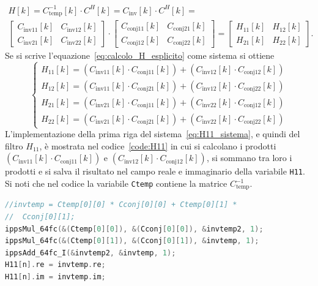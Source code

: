 \documentclass[12pt,a4paper,titlepage]{article}
\begin{document}
\begin{equation}\label{eq:calcolo_H_esplicito}
\begin{split}
H[k] = C_{\text{temp}}^{-1}[k] \cdot C^H[k] = C_{\text{inv}}[k] \cdot C^H[k] =\\
\begin{bmatrix}
C_{\text{inv}11}[k]	&	C_{\text{inv}12}[k]\\
C_{\text{inv}21}[k]	&	C_{\text{inv}22}[k]
\end{bmatrix}
\cdot
\begin{bmatrix}
C_{\text{conj}11}[k]	&	C_{\text{conj}21}[k]\\
C_{\text{conj}12}[k]	&	C_{\text{conj}22}[k]
\end{bmatrix}
=
\begin{bmatrix}
H_{11}[k]	&	H_{12}[k]\\
H_{21}[k]	&	H_{22}[k]
\end{bmatrix}.
\end{split}
\end{equation}
Se si scrive l'equazione~\eqref{eq:calcolo_H_esplicito} come sistema si ottiene
\begin{equation}\label{eq:H11_sistema}
\begin{cases}
H_{11}[k] = \left(C_{\text{inv}11}[k] \cdot C_{\text{conj}11}[k]\right) + \left(C_{\text{inv}12}[k] \cdot C_{\text{conj}12}[k]\right)\\
H_{12}[k] = \left(C_{\text{inv}11}[k] \cdot C_{\text{conj}21}[k]\right) + \left(C_{\text{inv}12}[k] \cdot C_{\text{conj}22}[k]\right)\\
H_{21}[k] = \left(C_{\text{inv}21}[k] \cdot C_{\text{conj}11}[k]\right) + \left(C_{\text{inv}22}[k] \cdot C_{\text{conj}12}[k]\right)\\
H_{22}[k] = \left(C_{\text{inv}21}[k] \cdot C_{\text{conj}21}[k]\right) + \left(C_{\text{inv}22}[k] \cdot C_{\text{conj}22}[k]\right)
\end{cases}
\end{equation}
L'implementazione della prima riga del sistema~\eqref{eq:H11_sistema}, e quindi del filtro $H_{11}$,  è mostrata nel codice~\ref{code:H11} in cui si calcolano i prodotti $\left(C_{\text{inv}11}[k] \cdot C_{\text{conj}11}[k]\right)$ e $\left(C_{\text{inv}12}[k] \cdot C_{\text{conj}12}[k]\right)$, si sommano tra loro i prodotti e si salva il risultato nel campo reale e immaginario della variabile \texttt{H11}. Si noti che nel codice la variabile \texttt{Ctemp} contiene la matrice $C^{-1}_{\text{temp}}$.
\begin{lstlisting}[language=cpp, label=code:H11, caption = Calcolo dell'$n$-esima armonica di \texttt{H11}, breaklines = false, captionpos = b]
//invtemp = Ctemp[0][0] * Cconj[0][0] + Ctemp[0][1] * 
//	Cconj[0][1];
ippsMul_64fc(&(Ctemp[0][0]), &(Cconj[0][0]), &invtemp2, 1);
ippsMul_64fc(&(Ctemp[0][1]), &(Cconj[0][1]), &invtemp, 1);
ippsAdd_64fc_I(&invtemp2, &invtemp, 1);
H11[n].re = invtemp.re;
H11[n].im = invtemp.im;
\end{lstlisting}
\end{document}
